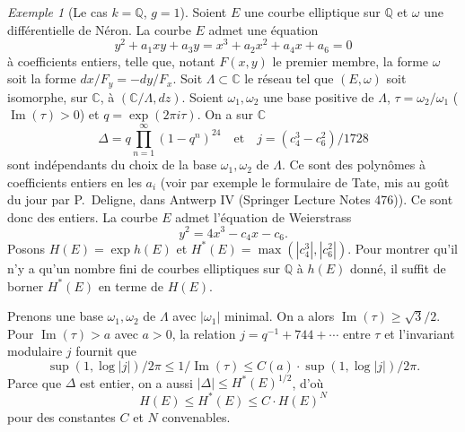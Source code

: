 \documentclass[12pt,a4paper]{article}
\theoremstyle{plain}
\theoremstyle{definition}
\theoremstyle{remark}
\newtheorem{example}[theorem]{Exemple}
\DeclareMathOperator{\Impartie}{Im}
\DeclareMathOperator{\Sup}{sup}
\newcommand{\CC}{\mathbb{C}}
\newcommand{\QQ}{\mathbb{Q}}
\providecommand{\CC}{\mathbb{C}}
\providecommand{\QQ}{\mathbb{Q}}
\begin{document}
\begin{example}[Le cas $k = \QQ$, $g = 1$]
Soient $E$ une courbe elliptique sur $\QQ$ et $\omega$ une différentielle de Néron. La courbe $E$ admet une équation
\[
y^2 + a_1xy + a_3y = x^3 + a_2x^2 + a_4x + a_6 = 0
\]
à coefficients entiers, telle que, notant $F(x,y)$ le premier membre, la forme $\omega$ soit la forme $dx/F_y = -dy/F_x$. Soit $\Lambda \subset \CC$ le réseau tel que $(E,\omega)$ soit isomorphe, sur $\CC$, à $(\CC/\Lambda, dz)$. Soient $\omega_1, \omega_2$ une base positive de $\Lambda$, $\tau = \omega_2/\omega_1$ ($\Impartie(\tau) > 0$) et $q = \exp(2\pi i \tau)$. On a sur $\CC$
\[
\Delta = q \prod_{n=1}^{\infty}(1-q^n)^{24} \quad \text{et} \quad j = (c_4^3 - c_6^2)/1728
\]
 sont indépendants du choix de la base $\omega_1, \omega_2$ de $\Lambda$. Ce sont des polynômes à coefficients entiers en les $a_i$ (voir par exemple le formulaire de Tate, mis au goût du jour par P.~Deligne, dans Antwerp IV (Springer Lecture Notes 476)). Ce sont donc des entiers. La courbe $E$ admet l'équation de Weierstrass
\[
y^2 = 4x^3 - c_4x - c_6.
\]
Posons $H(E) = \exp h(E)$ et $H^*(E) = \max(|c_4^3|, |c_6^2|)$. Pour montrer qu'il n'y a qu'un nombre fini de courbes elliptiques sur $\QQ$ à $h(E)$ donné, il suffit de borner $H^*(E)$ en terme de $H(E)$.

Prenons une base $\omega_1, \omega_2$ de $\Lambda$ avec $|\omega_1|$ minimal. On a alors $\Impartie(\tau) \geq \sqrt{3}/2$. Pour $\Impartie(\tau) > a$ avec $a > 0$, la relation $j = q^{-1} + 744 + \cdots$ entre $\tau$ et l'invariant modulaire $j$ fournit que
\[
\Sup(1, \log |j|) / 2\pi \leq 1/\Impartie(\tau) \leq C(a) \cdot \Sup(1, \log |j|) / 2\pi.
\]
Parce que $\Delta$ est entier, on a aussi $|\Delta| \leq H^*(E)^{1/2}$, d'où
\[
H(E) \leq H^*(E) \leq C \cdot H(E)^N
\]
pour des constantes $C$ et $N$ convenables.
\end{example}
\end{document}
